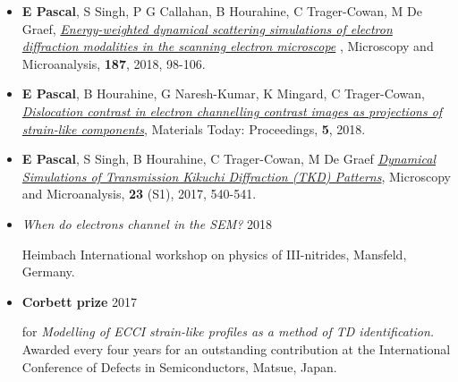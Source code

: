 \documentclass[
11pt, %
english, %
onehalfspacing, %
headsepline, %
chapterinoneline, %
]{MastersDoctoralThesis} %
\begin{document}
\begin{contributions}

\vspace{0.3cm}
\begin{itemize}
    \item \textbf{E Pascal}, S Singh, P  G Callahan, B Hourahine, C Trager-Cowan, M De Graef, \href{https://doi.org/10.1016/j.ultramic.2018.01.003}{\textit{Energy-weighted dynamical scattering simulations of electron diffraction modalities in the scanning electron microscope}} , Microscopy and Microanalysis,  \textbf{187}, 2018, 98-106.

    
    \item \textbf{E Pascal}, B Hourahine, G Naresh-Kumar, K Mingard, C Trager-Cowan, \href{https://doi.org/10.1016/j.matpr.2018.03.057}{\textit{Dislocation contrast in electron channelling contrast images as projections of strain-like components}}, Materials Today: Proceedings, \textbf{5}, 2018.
    
    \item \textbf{E Pascal}, S Singh, B Hourahine, C Trager-Cowan, M De Graef \href{https://www.cambridge.org/core/journals/microscopy-and-microanalysis/article/dynamical-simulations-of-transmission-kikuchi-diffraction-tkd-patterns/1863E684CEDF207910A5BFE58D7DE902/share/e286c71a1d759f81d3417ebf6cb4e78b8d81fcd2}{\textit{Dynamical Simulations of Transmission Kikuchi Diffraction (TKD) Patterns}}, Microscopy and Microanalysis, \textbf{23} (S1), 2017, 540-541.
\end{itemize}

\vspace{0.3cm}

\begin{itemize}
    \item \begin{flushleft}\textit{When do electrons channel in the SEM?}  \hfill{} 2018  \end{flushleft}
    Heimbach International workshop on physics of III-nitrides, Mansfeld, Germany.
\end{itemize}

\vspace{0.3cm}
\begin{itemize}
\item \begin{flushleft}\textbf{ Corbett prize } \hfill{} 2017  \end{flushleft}
for \textit{Modelling of ECCI strain-like profiles as a method of TD identification.}\\
    Awarded every four years for an outstanding contribution at the International Conference of Defects in Semiconductors, Matsue, Japan.


\end{itemize}
\end{contributions}
\end{document}
